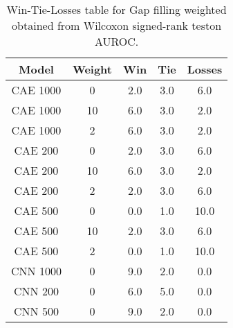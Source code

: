 \begin{table}[H]
\centering
\begin{tabular}{|c|c|c|c|c|}

\textbf{Model} & \textbf{Weight} &  \textbf{Win} &  \textbf{Tie} &  \textbf{Losses} \\
\hline

      CAE 1000 &               0 &           2.0 &           3.0 &              6.0 \\
\hline
      CAE 1000 &              10 &           6.0 &           3.0 &              2.0 \\
\hline
      CAE 1000 &               2 &           6.0 &           3.0 &              2.0 \\
\hline
       CAE 200 &               0 &           2.0 &           3.0 &              6.0 \\
\hline
       CAE 200 &              10 &           6.0 &           3.0 &              2.0 \\
\hline
       CAE 200 &               2 &           2.0 &           3.0 &              6.0 \\
\hline
       CAE 500 &               0 &           0.0 &           1.0 &             10.0 \\
\hline
       CAE 500 &              10 &           2.0 &           3.0 &              6.0 \\
\hline
       CAE 500 &               2 &           0.0 &           1.0 &             10.0 \\
\hline
      CNN 1000 &               0 &           9.0 &           2.0 &              0.0 \\
\hline
       CNN 200 &               0 &           6.0 &           5.0 &              0.0 \\
\hline
       CNN 500 &               0 &           9.0 &           2.0 &              0.0 \\
\hline

\end{tabular}
\caption{Win-Tie-Losses table for Gap filling weighted obtained from Wilcoxon signed-rank teston AUROC.}
\label{tab:gap_filling_weighted_weighted_comparison_all}
\end{table}